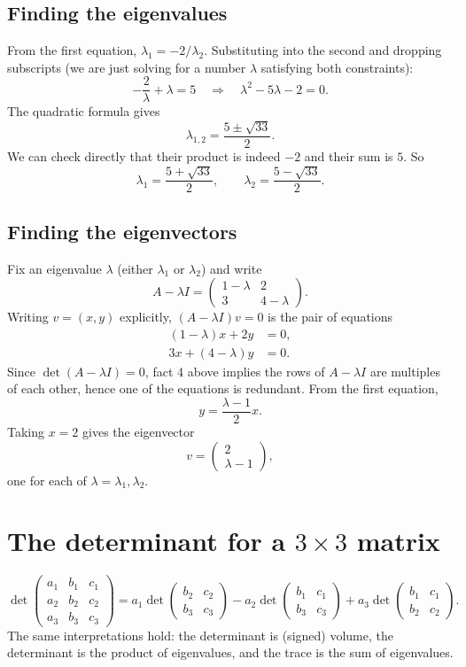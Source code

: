 \subsection*{Finding the eigenvalues}
From the first equation, $\lambda_1 = -2/\lambda_2$. Substituting into
the second and dropping subscripts (we are just solving for a number
$\lambda$ satisfying both constraints):
\[
-\frac{2}{\lambda} + \lambda = 5 \quad\Longrightarrow\quad \lambda^2 -
5\lambda - 2 = 0.
\]
The quadratic formula gives
\[
\lambda_{1,2} = \frac{5\pm\sqrt{33}}{2}.
\]
We can check directly that their product is indeed $-2$ and their sum is $5$. So
\[
\lambda_1 = \frac{5+\sqrt{33}}{2}, \qquad \lambda_2 =
\frac{5-\sqrt{33}}{2}.
\]

\subsection*{Finding the eigenvectors}
Fix an eigenvalue $\lambda$ (either $\lambda_1$ or $\lambda_2$) and
write
\[
A - \lambda I = \begin{pmatrix}1-\lambda & 2\\ 3 & 4-\lambda\end{pmatrix}.
\]
Writing $v=(x,y)$ explicitly, $(A-\lambda I)v=0$ is the pair of
equations
\begin{align*}
(1-\lambda)x + 2y &= 0, \\
3x+ (4-\lambda)y &= 0.
\end{align*}
Since $\det (A-\lambda I) = 0$, fact 4 above implies the rows of
$A-\lambda I$ are multiples of each other, hence one of the equations
is redundant. From the first equation,
\[
y = \frac{\lambda-1}{2}x.
\]
Taking $x=2$ gives the eigenvector
\[
v = \begin{pmatrix}2\\ \lambda-1\end{pmatrix},
\]
one for each of $\lambda=\lambda_1,\lambda_2$.

\section{The determinant for a $3\times 3$ matrix}
\[
\det\begin{pmatrix}a_1&b_1&c_1\\a_2&b_2&c_2\\a_3&b_3&c_3\end{pmatrix}
= a_1\det\begin{pmatrix}b_2&c_2\\b_3&c_3\end{pmatrix}
- a_2\det\begin{pmatrix}b_1&c_1\\b_3&c_3\end{pmatrix}
+ a_3\det\begin{pmatrix}b_1&c_1\\b_2&c_2\end{pmatrix}.
\]
The same interpretations hold: the determinant is (signed) volume, the
determinant is the product of eigenvalues, and the trace is the sum of
eigenvalues.
